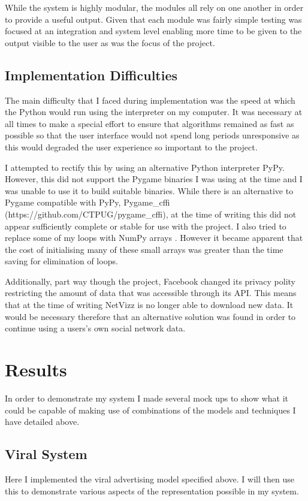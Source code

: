 \documentclass[12pt,a4paper]{article}
\begin{document}
While the system is highly modular, the modules all rely on one another in order to provide a useful output. Given that each module was fairly simple testing was focused at an integration and system level enabling  more time to be given to the output visible to the user as was the focus of the project.

\subsection{Implementation Difficulties}
\noindent
The main difficulty that I faced during implementation was the speed at which the Python would run using the interpreter on my computer. It was necessary at all times to make a special effort to ensure that algorithms remained as fast as possible so that the user interface would not spend long periods unresponsive as this would degraded the user experience so important to the project.

I attempted to rectify this by using an alternative Python interpreter PyPy. However, this did not support the Pygame binaries I was using at the time and I was unable to use it to build suitable binaries. While there is an alternative to Pygame compatible with PyPy, Pygame\_cffi (https://github.com/CTPUG/pygame\_cffi), at the time of writing this did not appear sufficiently complete or stable for use with the project. I also tried to replace some of my loops with NumPy arrays \cite{van2011numpy}. However it became apparent that the cost of initialising many of these small arrays was greater than the time saving for elimination of loops.

Additionally, part way though the project, Facebook changed its privacy polity restricting the amount of data that was accessible through its API. This means that at the time of writing NetVizz is no longer able to download new data. It would be necessary therefore that an alternative solution was found in order to continue using a users's own social network data.

\section{Results}
\noindent
In order to demonstrate my system I made several mock ups to show what it could be capable of making use of combinations of the models and techniques I have detailed above.

\subsection{Viral System}
\noindent
Here I implemented the viral advertising model specified above. I will then use this to demonstrate various aspects of the representation possible in my system.
\end{document}
